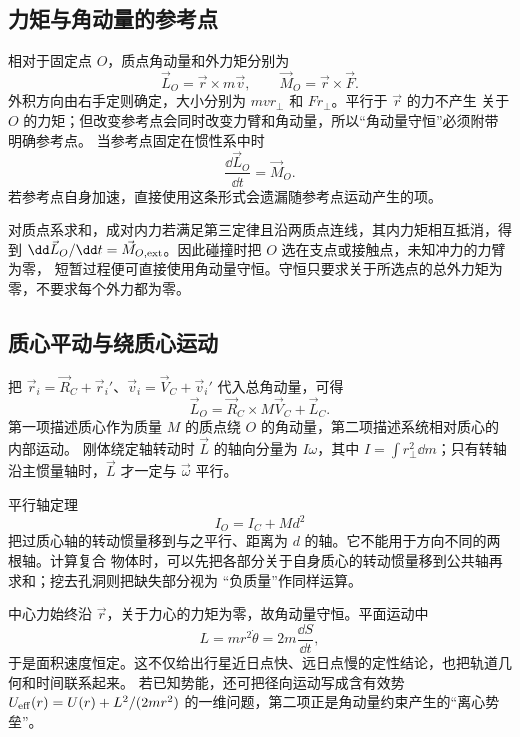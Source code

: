 \subsection*{力矩与角动量的参考点}

相对于固定点 $O$，质点角动量和外力矩分别为
\[
 \vec L_O=\vec r\times m\vec v,
 \qquad
 \vec M_O=\vec r\times\vec F.
\]
外积方向由右手定则确定，大小分别为 $mvr_\perp$ 和 $Fr_\perp$。平行于 $\vec r$ 的力不产生
关于 $O$ 的力矩；但改变参考点会同时改变力臂和角动量，所以“角动量守恒”必须附带明确参考点。
当参考点固定在惯性系中时
\[
 \frac{\dd\vec L_O}{\dd t}=\vec M_O.
\]
若参考点自身加速，直接使用这条形式会遗漏随参考点运动产生的项。

对质点系求和，成对内力若满足第三定律且沿两质点连线，其内力矩相互抵消，得到
$\dd\vec L_O/\dd t=\vec M_{O,\rm ext}$。因此碰撞时把 $O$ 选在支点或接触点，未知冲力的力臂为零，
短暂过程便可直接使用角动量守恒。守恒只要求关于所选点的总外力矩为零，不要求每个外力都为零。

\subsection*{质心平动与绕质心运动}

把 $\vec r_i=\vec R_C+\vec r_i'$、$\vec v_i=\vec V_C+\vec v_i'$ 代入总角动量，可得
\[
 \vec L_O=\vec R_C\times M\vec V_C+\vec L_C.
\]
第一项描述质心作为质量 $M$ 的质点绕 $O$ 的角动量，第二项描述系统相对质心的内部运动。
刚体绕定轴转动时 $\vec L$ 的轴向分量为 $I\omega$，其中
$I=\int r_\perp^2\dd m$；只有转轴沿主惯量轴时，$\vec L$ 才一定与 $\vec\omega$ 平行。

平行轴定理
\[
 I_O=I_C+Md^2
\]
把过质心轴的转动惯量移到与之平行、距离为 $d$ 的轴。它不能用于方向不同的两根轴。计算复合
物体时，可以先把各部分关于自身质心的转动惯量移到公共轴再求和；挖去孔洞则把缺失部分视为
“负质量”作同样运算。

中心力始终沿 $\vec r$，关于力心的力矩为零，故角动量守恒。平面运动中
\[
 L=mr^2\dot\theta=2m\frac{\dd S}{\dd t},
\]
于是面积速度恒定。这不仅给出行星近日点快、远日点慢的定性结论，也把轨道几何和时间联系起来。
若已知势能，还可把径向运动写成含有效势
$U_{\rm eff}(r)=U(r)+L^2/(2mr^2)$ 的一维问题，第二项正是角动量约束产生的“离心势垒”。


